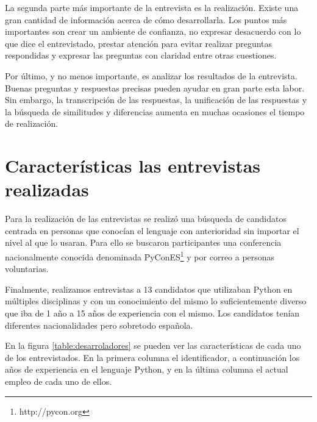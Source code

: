 \documentclass[a4paper, 12pt]{book}
\begin{document}
La segunda parte más importante de la entrevista es la realización. Existe una gran cantidad de información acerca de cómo desarrollarla. Los puntos más importantes son crear un ambiente de confianza, no expresar desacuerdo con lo que dice el entrevistado, prestar atención para evitar realizar preguntas respondidas y expresar las preguntas con claridad entre otras cuestiones\cite{kvale1996interviews}.

Por último, y no menos importante, es analizar los resultados de la entrevista. Buenas preguntas y respuestas precisas pueden ayudar en gran parte esta labor. Sin embargo, la transcripción de las respuestas, la unificación de las respuestas y la búsqueda de similitudes y diferencias aumenta en muchas ocasiones el tiempo de realización.


\section{Características las entrevistas realizadas}

Para la realización de las entrevistas se realizó una búsqueda de candidatos centrada en personas que conocían el lenguaje con anterioridad sin importar el nivel al que lo usaran. Para ello se buscaron participantes una conferencia nacionalmente conocida denominada PyConES\footnote{http://pycon.org} y por correo a personas voluntarias.

Finalmente, realizamos entrevistas a 13 candidatos que utilizaban Python en múltiples disciplinas y con un conocimiento del mismo lo suficientemente diverso que iba de 1 año a 15 años de experiencia con el mismo. Los candidatos tenían diferentes nacionalidades pero sobretodo española.

En la figura \ref{table:desarroladores} se pueden ver las características de cada uno de los entrevistados. En la primera columna el identificador, a continuación los años de experiencia en el lenguaje Python, y en la última columna el actual empleo de cada uno de ellos.
\end{document}

